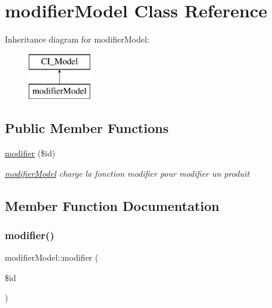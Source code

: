 \hypertarget{classmodifier_model}{}\section{modifier\+Model Class Reference}
\label{classmodifier_model}
Inheritance diagram for modifier\+Model\+:\begin{figure}[H]
\begin{center}
\leavevmode
\includegraphics[height=2.000000cm]{classmodifier_model}
\end{center}
\end{figure}
\subsection*{Public Member Functions}
\begin{DoxyCompactItemize}
\item 
\mbox{\hyperlink{classmodifier_model_a4af4ba2f34802a10b92313c9bc28a2a0}{modifier}} (\$id)
\begin{DoxyCompactList}\small\item\em \mbox{\hyperlink{classmodifier_model}{modifier\+Model}} charge la fonction modifier pour modifier un produit \end{DoxyCompactList}\end{DoxyCompactItemize}


\subsection{Member Function Documentation}
\mbox{\label{classmodifier_model_a4af4ba2f34802a10b92313c9bc28a2a0}} 
\subsubsection{\texorpdfstring{modifier()}{modifier()}}
{\footnotesize\ttfamily modifier\+Model\+::modifier (\begin{DoxyParamCaption}\item[{}]{\$id }\end{DoxyParamCaption})}



